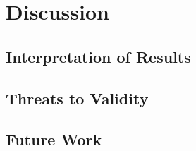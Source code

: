 
\section{Discussion}
\label{sec:discussion}

\subsection{Interpretation of Results}
\label{sec:interpretation}

\lipsum[1-5]

\subsection{Threats to Validity}
\label{sec:threats}

\lipsum[1-3]

\subsection{Future Work}
\label{sec:future-work}

\lipsum[1-3]